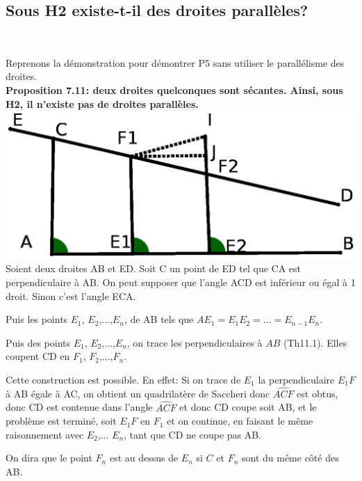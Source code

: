 \documentclass[a4paper, 12pt, twoside]{book}
\begin{document}
 \newpage  \subsection{Sous H2 existe-t-il des droites parallèles?}\
  
  Reprenons la démonstration pour démontrer P5 sans utiliser le parallélisme des droites.\\
  
  
  \textbf{Proposition 7.11: deux droites quelconques sont sécantes. Ainsi, sous H2, il n'existe pas de droites parallèles.}\\
  
  
  

  
  \includegraphics[scale=0.6]{figures/sacc20.eps} \\
  
 
    Soient deux droites AB et ED. Soit C un point de ED tel que CA est perpendiculaire à AB. On peut supposer que l'angle ACD est inférieur ou égal à 1 droit. Sinon c'est l'angle ECA. \
    
    Puis les points $E_{1}$, $E_{2}$,...,$E_{n}$, de AB tels que $AE_{1}=E_{1}E_{2}=...=E_{n-1}E_{n}$.\
    
    
  Puis des points $E_{1}$, $E_{2}$,...,$E_{n}$, on trace les perpendiculaires à $AB$ (Th11.1). Elles coupent CD en $F_{1}$, $F_{2}$,...,$F_{n}$.\
   
   Cette construction est possible. En effet: Si on trace de $E_{1}$ la perpendiculaire $E_{1}F$ à AB égale à AC, on obtient un quadrilatère de Saccheri donc $\hat{ACF}$ est obtus, donc CD est contenue dans l'angle $\hat{ACF}$ et donc CD coupe soit AB, et le problème est terminé, soit $E_{1}F$ en $F_{1}$ et on continue, en faisant le même raisonnement avec $E_{2}$,... $E_{n}$, tant que CD ne coupe pas AB. \
   
   
   
   On dira que le point $F_{n}$ est au dessus de $E_{n}$  si  $C$ et $F_{n}$ sont du même côté des AB.\
  
\end{document}
